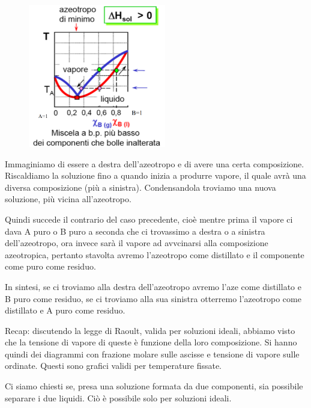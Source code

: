 \begin{minipage}{0.4\textwidth}
    \begin{figure}[H]
        \includegraphics[width=6cm]{immagini/distillazione_endotermica.png}
    \end{figure}
\end{minipage}
\begin{minipage}{0.6\textwidth}
    \vspace{0.6cm}Immaginiamo di essere a destra dell'azeotropo e di avere una certa composizione. Riscaldiamo la soluzione fino a quando inizia a produrre vapore, il quale avrà una diversa composizione (più a sinistra). Condensandola troviamo una nuova soluzione, più vicina all'azeotropo.

    Quindi succede il contrario del caso precedente, cioè mentre prima il vapore ci dava A puro o B puro a seconda che ci trovassimo a destra o a sinistra dell'azeotropo, ora invece sarà il vapore ad avvcinarsi alla composizione azeotropica, pertanto stavolta avremo l'azeotropo come distillato e il componente come puro come residuo.
\end{minipage}

In sintesi, se ci troviamo alla destra dell'azeotropo avremo l'aze come distillato e B puro come residuo, se ci troviamo alla sua sinistra otterremo l'azeotropo come distillato e A puro come residuo.

\vspace{0.2cm}Recap: discutendo la legge di Raoult, valida per soluzioni ideali, abbiamo visto che la tensione di vapore di queste è funzione della loro composizione. Si hanno quindi dei diagrammi con frazione molare sulle ascisse e tensione di vapore sulle ordinate. Questi sono grafici validi per temperature fissate.

Ci siamo chiesti se, presa una soluzione formata da due componenti, sia possibile separare i due liquidi. Ciò è possibile solo per soluzioni ideali.

